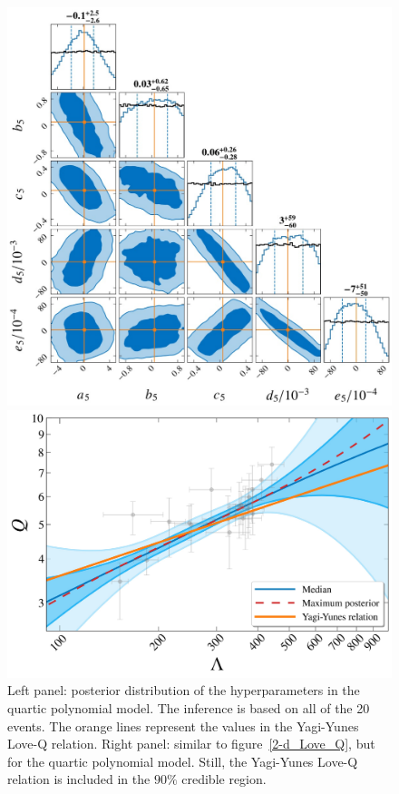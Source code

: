 \documentclass[a4paper,11pt]{article}
\begin{document}
\begin{figure}
\begin{minipage}[t]{0.49\textwidth}
\centering
\includegraphics[width=0.8\linewidth]{Hyper_parameter_5d.pdf}%
\end{minipage}
\hfill
\begin{minipage}[t]{0.49\textwidth}
\includegraphics[width=\linewidth]{hierarchical_results_APR4_5d.pdf}
\end{minipage}
    \caption{\label{5-d_Love_Q} Left panel: posterior distribution of the hyperparameters in the quartic polynomial model. The inference is based on all of the 20 events. The orange lines represent the values in the Yagi-Yunes Love-Q relation. Right panel: similar to figure~\ref{2-d_Love_Q}, but for the quartic polynomial model. Still, the Yagi-Yunes Love-Q relation is included in the $90\%$ credible region.} 
\end{figure}
\end{document}

